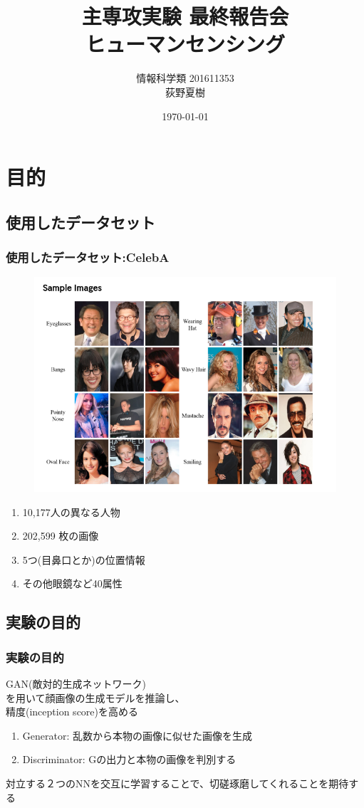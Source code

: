 \documentclass[dvipdfmx,12pt]{beamer}
\title[ヒューマンセンシング]{主専攻実験 最終報告会 \\ ヒューマンセンシング}
\author[荻野夏樹]{情報科学類 201611353 \\ 荻野夏樹}
\date{\today}
\begin{document}
\maketitle
\section{目的}
\subsection{使用したデータセット}
\begin{frame}
	\frametitle{使用したデータセット:CelebA}
	\begin{figure}[htbp]
	\begin{center}
	\includegraphics[width=0.7\hsize]{./SelebA_discription.png}
	\end{center}
	\end{figure}

	\begin{enumerate}
		\item 10,177人の異なる人物
		\item 202,599 枚の画像
		\item 5つ(目鼻口とか)の位置情報
		\item その他眼鏡など40属性
	\end{enumerate}
\end{frame}

\subsection{実験の目的}
\begin{frame}
	\frametitle{実験の目的}
	{\large GAN(敵対的生成ネットワーク)\\を用いて顔画像の生成モデルを推論し、\\精度(inception score)を高める}
	\begin{enumerate}
		\item Generator: 乱数から本物の画像に似せた画像を生成
		\item Discriminator: Gの出力と本物の画像を判別する
	\end{enumerate}
	対立する２つのNNを交互に学習することで、切磋琢磨してくれることを期待する
\end{frame}
\end{document}
